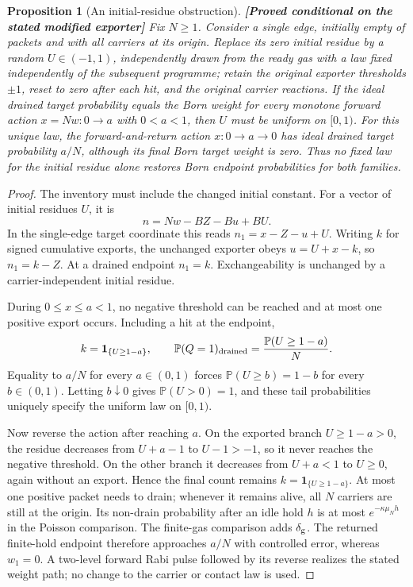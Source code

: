\documentclass[11pt,a4paper]{article}
\newtheorem{proposition}[theorem]{Proposition}
\theoremstyle{definition}
\theoremstyle{remark}\newtheorem{remark}[theorem]{Remark}
\newcommand{\status}[1]{\textbf{[#1]}\quad}
\begin{document}
\begin{proposition}[An initial-residue obstruction]\label{pil:residueobstruction}
\status{Proved conditional on the stated modified exporter}
Fix $N\ge1$. Consider a single edge, initially empty of packets and with all carriers at its origin. Replace its zero initial residue by a random $U\in(-1,1)$, independently drawn from the ready gas with a law fixed independently of the subsequent programme; retain the original exporter thresholds $\pm1$, reset to zero after each hit, and the original carrier reactions. If the ideal drained target probability equals the Born weight for every monotone forward action $x=Nw:0\to a$ with $0<a<1$, then $U$ must be uniform on $[0,1)$. For this unique law, the forward-and-return action $x:0\to a\to0$ has ideal drained target probability $a/N$, although its final Born target weight is zero. Thus no fixed law for the initial residue alone restores Born endpoint probabilities for both families.
\end{proposition}
\begin{proof}
The inventory must include the changed initial constant. For a vector of initial residues $U$, it is
\[
 n=Nw-BZ-Bu+BU.
\]
In the single-edge target coordinate this reads $n_1=x-Z-u+U$. Writing $k$ for signed cumulative exports, the unchanged exporter obeys $u=U+x-k$, so $n_1=k-Z$. At a drained endpoint $n_1=k$. Exchangeability is unchanged by a carrier-independent initial residue.

During $0\le x\le a<1$, no negative threshold can be reached and at most one positive export occurs. Including a hit at the endpoint,
\[
 k=\mathbf1_{\{U\ge1-a\}},\qquad
 \mathbb P(Q=1)_{\rm drained}=\frac{\mathbb P(U\ge1-a)}{N}.
\]
Equality to $a/N$ for every $a\in(0,1)$ forces
$\mathbb P(U\ge b)=1-b$ for every $b\in(0,1)$. Letting $b\downarrow0$ gives $\mathbb P(U>0)=1$, and these tail probabilities uniquely specify the uniform law on $[0,1)$.

Now reverse the action after reaching $a$. On the exported branch $U\ge1-a>0$, the residue decreases from $U+a-1$ to $U-1>-1$, so it never reaches the negative threshold. On the other branch it decreases from $U+a<1$ to $U\ge0$, again without an export. Hence the final count remains $k=\mathbf1_{\{U\ge1-a\}}$. At most one positive packet needs to drain; whenever it remains alive, all $N$ carriers are still at the origin. Its non-drain probability after an idle hold $h$ is at most $e^{-\kappa\mu_Nh}$ in the Poisson comparison. The finite-gas comparison adds $\delta_{\rm g}$. The returned finite-hold endpoint therefore approaches $a/N$ with controlled error, whereas $w_1=0$. A two-level forward Rabi pulse followed by its reverse realizes the stated weight path; no change to the carrier or contact law is used.
\end{proof}
\end{document}
